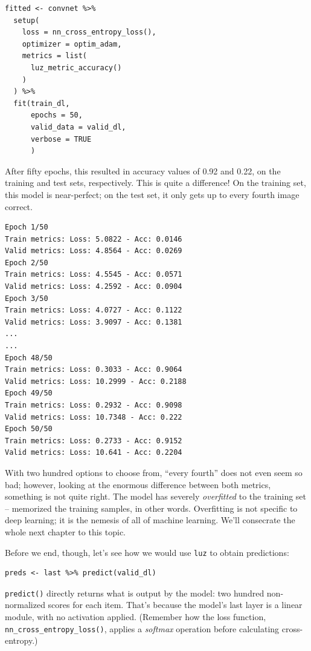 \documentclass[
  letterpaper,
]{krantz}
\begin{document}
\begin{verbatim}
fitted <- convnet %>%
  setup(
    loss = nn_cross_entropy_loss(),
    optimizer = optim_adam,
    metrics = list(
      luz_metric_accuracy()
    )
  ) %>%
  fit(train_dl,
      epochs = 50,
      valid_data = valid_dl,
      verbose = TRUE
      )
\end{verbatim}

After fifty epochs, this resulted in accuracy values of 0.92 and 0.22,
on the training and test sets, respectively. This is quite a difference!
On the training set, this model is near-perfect; on the test set, it
only gets up to every fourth image correct.

\begin{verbatim}
Epoch 1/50
Train metrics: Loss: 5.0822 - Acc: 0.0146                                     
Valid metrics: Loss: 4.8564 - Acc: 0.0269
Epoch 2/50
Train metrics: Loss: 4.5545 - Acc: 0.0571                                     
Valid metrics: Loss: 4.2592 - Acc: 0.0904
Epoch 3/50
Train metrics: Loss: 4.0727 - Acc: 0.1122                                     
Valid metrics: Loss: 3.9097 - Acc: 0.1381
...
...
Epoch 48/50
Train metrics: Loss: 0.3033 - Acc: 0.9064                                     
Valid metrics: Loss: 10.2999 - Acc: 0.2188
Epoch 49/50
Train metrics: Loss: 0.2932 - Acc: 0.9098                                     
Valid metrics: Loss: 10.7348 - Acc: 0.222
Epoch 50/50
Train metrics: Loss: 0.2733 - Acc: 0.9152                                     
Valid metrics: Loss: 10.641 - Acc: 0.2204
\end{verbatim}

With two hundred options to choose from, ``every fourth'' does not even
seem so bad; however, looking at the enormous difference between both
metrics, something is not quite right. The model has severely
\emph{overfitted} to the training set -- memorized the training samples,
in other words. Overfitting is not specific to deep learning; it is the
nemesis of all of machine learning. We'll consecrate the whole next
chapter to this topic.

Before we end, though, let's see how we would use \texttt{luz} to obtain
predictions:

\begin{verbatim}
preds <- last %>% predict(valid_dl)
\end{verbatim}

\texttt{predict()} directly returns what is output by the model: two
hundred non-normalized scores for each item. That's because the model's
last layer is a linear module, with no activation applied. (Remember how
the loss function, \texttt{nn\_cross\_entropy\_loss()}, applies a
\emph{softmax} operation before calculating cross-entropy.)
\end{document}
